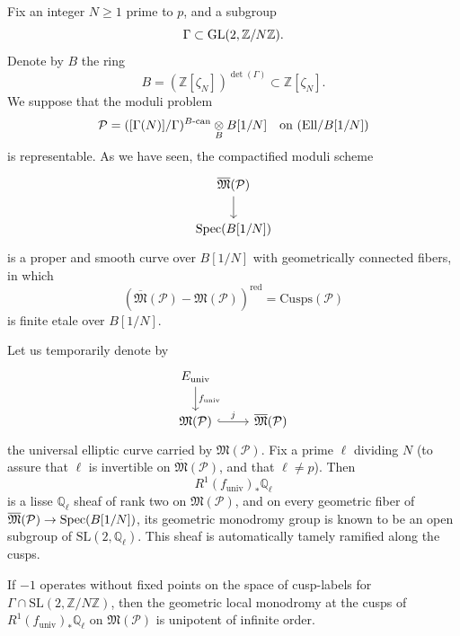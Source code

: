 \kmitem\label{item:14.3.1}
Fix an integer $N \ge 1$ prime to $p$, and a subgroup
\[
\Gamma \subset \operatorname{GL}(2, \mathbb{Z}/N\mathbb{Z}) .
\]
Denote by $B$ the ring
\[
B = (\mathbb{Z}[\zeta_N])^{\det(\Gamma)} \subset \mathbb{Z}[\zeta_N] .
\]
We suppose that the moduli problem
\[
\mathcal{P} = ([\Gamma(N)]/\Gamma)^{B\text{-}\mathrm{can}} \underset{B}{\otimes} B[1/N] \quad\text{on } (\mathrm{Ell}/B[1/N])
\]
is representable. As we have seen, the compactified moduli scheme
\[
\begin{tikzcd}[row sep=1.8em]
\overline{\mathfrak{M}}(\mathcal{P}) \arrow[d] \\
\Spec(B[1/N])
\end{tikzcd}
\]
is a proper and smooth curve over $B[1/N]$ with geometrically connected fibers, in which
\[
(\overline{\mathfrak{M}}(\mathcal{P}) - \mathfrak{M}(\mathcal{P}))^{\mathrm{red}} = \mathrm{Cusps}(\mathcal{P})
\]
is finite etale over $B[1/N]$.

\kmitem\label{item:14.3.2}
Let us temporarily denote by
\begin{equation}\label{eq:14.3.2.1}
\begin{tikzcd}[row sep=1.8em, column sep=2.5em]
E_{\mathrm{univ}} \arrow[d, "f_{\mathrm{univ}}"] \\
\mathfrak{M}(\mathcal{P}) \arrow[r, "j", hook] & \overline{\mathfrak{M}}(\mathcal{P})
\end{tikzcd}
\end{equation}
the universal elliptic curve carried by $\mathfrak{M}(\mathcal{P})$. Fix a prime $\ell$ dividing $N$ (to assure that $\ell$ is invertible on $\overline{\mathfrak{M}}(\mathcal{P})$, and that $\ell \neq p$). Then
\begin{equation}\label{eq:14.3.2.2}
R^1 (f_{\mathrm{univ}})_* \mathbb{Q}_\ell
\end{equation}
is a lisse $\mathbb{Q}_\ell$ sheaf of rank two on $\mathfrak{M}(\mathcal{P})$, and on every geometric fiber of $\overline{\mathfrak{M}}(\mathcal{P}) \to \operatorname{Spec}(B[1/N])$, its geometric monodromy group is known to be an open subgroup of $\mathrm{SL}(2, \mathbb{Q}_\ell)$. This sheaf is automatically tamely ramified along the cusps.

\begin{proposition}\label{prop:14.3.3}
If $-1$ operates without fixed points on the space of cusp-labels for $\Gamma \cap \mathrm{SL}(2, \mathbb{Z}/N\mathbb{Z})$, then the geometric local monodromy at the cusps of $R^1(f_{\mathrm{univ}})_* \mathbb{Q}_\ell$ on $\mathfrak{M}(\mathcal{P})$ is unipotent of infinite order.
\end{proposition}

